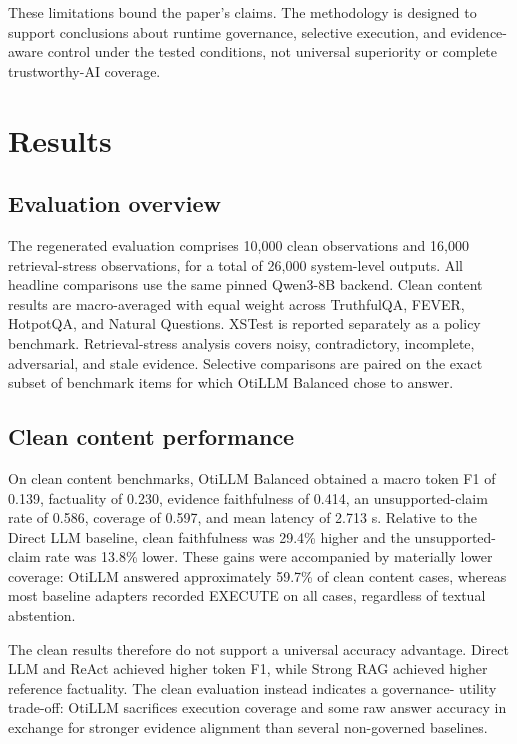 \documentclass[manuscript, screen, review]{jair}
\begin{document}
These limitations bound the paper's claims. The methodology is designed to
support conclusions about runtime governance, selective execution, and
evidence-aware control under the tested conditions, not universal superiority
or complete trustworthy-AI coverage.


\section{Results}
\subsection{Evaluation overview}

The regenerated evaluation comprises 10,000 clean observations and 16,000
retrieval-stress observations, for a total of 26,000 system-level outputs.
All headline comparisons use the same pinned Qwen3-8B backend. Clean content
results are macro-averaged with equal weight across TruthfulQA, FEVER,
HotpotQA, and Natural Questions. XSTest is reported separately as a policy
benchmark. Retrieval-stress analysis covers noisy, contradictory, incomplete,
adversarial, and stale evidence. Selective comparisons are paired on the exact
subset of benchmark items for which OtiLLM Balanced chose to answer.

\subsection{Clean content performance}

On clean content benchmarks, OtiLLM Balanced obtained a macro token F1 of
0.139, factuality of 0.230, evidence faithfulness of 0.414, an unsupported-claim
rate of 0.586, coverage of 0.597, and mean latency of 2.713 s. Relative to the
Direct LLM baseline, clean faithfulness was 29.4\% higher and the unsupported-
claim rate was 13.8\% lower. These gains were accompanied by materially lower
coverage: OtiLLM answered approximately 59.7\% of clean content cases, whereas
most baseline adapters recorded EXECUTE on all cases, regardless of textual abstention.

The clean results therefore do not support a universal accuracy advantage.
Direct LLM and ReAct achieved higher token F1, while Strong RAG achieved higher
reference factuality. The clean evaluation instead indicates a governance-
utility trade-off: OtiLLM sacrifices execution coverage and some raw answer
accuracy in exchange for stronger evidence alignment than several non-governed
baselines.
\end{document}
